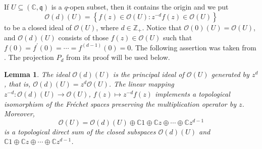 \documentclass[12pt,reqno]{amsart}%
\theoremstyle{plain}
\newtheorem{lemma}{Lemma}
\numberwithin{theorem}{section} \numberwithin{equation}{section}
\numberwithin{lemma}{section}
\numberwithin{remark}{section}
\numberwithin{example}{section}
\numberwithin{proposition}{section}
\numberwithin{definition}{section}
\numberwithin{corollary}{section}
\begin{document}
If $U\subseteq\left(  \mathbb{C},\mathfrak{q}\right)  $ is a $q$-open subset,
then it contains the origin and we put%
\[
\mathcal{O}\left(  d\right)  \left(  U\right)  =\left\{  f\left(  z\right)
\in\mathcal{O}\left(  U\right)  :z^{-d}f\left(  z\right)  \in\mathcal{O}%
\left(  U\right)  \right\}
\]
to be a closed ideal of $\mathcal{O}\left(  U\right)  $, where $d\in
\mathbb{Z}_{+}$. Notice that $\mathcal{O}\left(  0\right)  \left(  U\right)
=\mathcal{O}\left(  U\right)  $, and $\mathcal{O}\left(  d\right)  \left(
U\right)  $ consists of those $f\left(  z\right)  \in\mathcal{O}\left(
U\right)  $ such that $f\left(  0\right)  =f^{\prime}\left(  0\right)
=\cdots=f^{\left(  d-1\right)  }\left(  0\right)  =0$. The following assertion
was taken from \cite[Lemma 2.2]{Dosi25}. The projection $P_{d}$ from its proof
will be used below.

\begin{lemma}
\label{lemMD}The ideal $\mathcal{O}\left(  d\right)  \left(  U\right)  $ is
the principal ideal of $\mathcal{O}\left(  U\right)  $ generated by $z^{d}$,
that is, $\mathcal{O}\left(  d\right)  \left(  U\right)  =z^{d}\mathcal{O}%
\left(  U\right)  $. The linear mapping $z^{-d}:\mathcal{O}\left(  d\right)
\left(  U\right)  \rightarrow\mathcal{O}\left(  U\right)  $, $f\left(
z\right)  \mapsto z^{-d}f\left(  z\right)  $ implements a topological
isomorphism of the Fr\'{e}chet spaces preserving the multiplication operator
by $z$. Moreover,
\[
\mathcal{O}\left(  U\right)  =\mathcal{O}\left(  d\right)  \left(  U\right)
\oplus\mathbb{C}1\oplus\mathbb{C}z\oplus\cdots\oplus\mathbb{C}z^{d-1}%
\]
is a topological direct sum of the closed subspaces $\mathcal{O}\left(
d\right)  \left(  U\right)  $ and $\mathbb{C}1\oplus\mathbb{C}z\oplus
\cdots\oplus\mathbb{C}z^{d-1}$.
\end{lemma}
\end{document}
